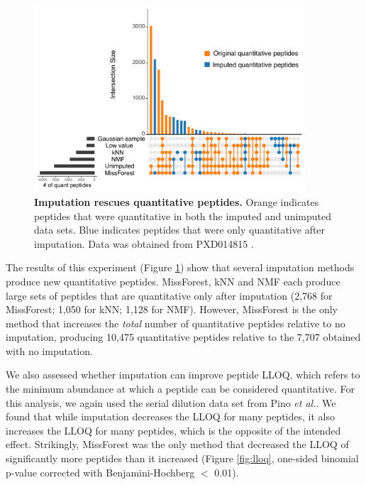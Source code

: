 \documentclass{article}
\begin{document}
\begin{figure}[t]
  \centering
  \includegraphics[width=0.9\textwidth]{figures/upset-plot-v3.pdf}
  \caption{{\bf Imputation rescues quantitative peptides.} Orange indicates peptides that were quantitative in both the imputed and unimputed data sets. Blue indicates peptides that were only quantitative after imputation. Data was obtained from PXD014815 \cite{matrix-matched-calib}.}
  \label{fig:rescue-experiment}
\end{figure}

The results of this experiment (Figure \ref{fig:rescue-experiment}) show that several imputation methods produce new quantitative peptides. MissForest, kNN and NMF each produce large sets of peptides that are quantitative only after imputation (2,768 for MissForest; 1,050 for kNN; 1,128 for NMF). However, MissForest is the only method that increases the \textit{total} number of quantitative peptides relative to no imputation, producing 10,475 quantitative peptides relative to the 7,707 obtained with no imputation. 

We also assessed whether imputation can improve peptide LLOQ, which refers to the minimum abundance at which a peptide can be considered quantitative. For this analysis, we again used the serial dilution data set from Pino \textit{et al.}. We found that while imputation decreases the LLOQ for many peptides, it also increases the LLOQ for many peptides, which is the opposite of the intended effect. Strikingly, MissForest was the only method that decreased the LLOQ of significantly more peptides than it increased (Figure \ref{fig:lloq}, one-sided binomial p-value corrected with Benjamini-Hochberg $<$ 0.01).
\end{document}
